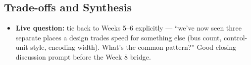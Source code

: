 \documentclass[11pt]{article}
\begin{document}
\subsection{Trade-offs and Synthesis}
\begin{itemize}
  \item \textbf{Live question:} tie back to Weeks 5--6 explicitly --- ``we've now seen three separate places a design trades speed for something else (bus count, control-unit style, encoding width). What's the common pattern?'' Good closing discussion prompt before the Week 8 bridge.
\end{itemize}
\end{document}
